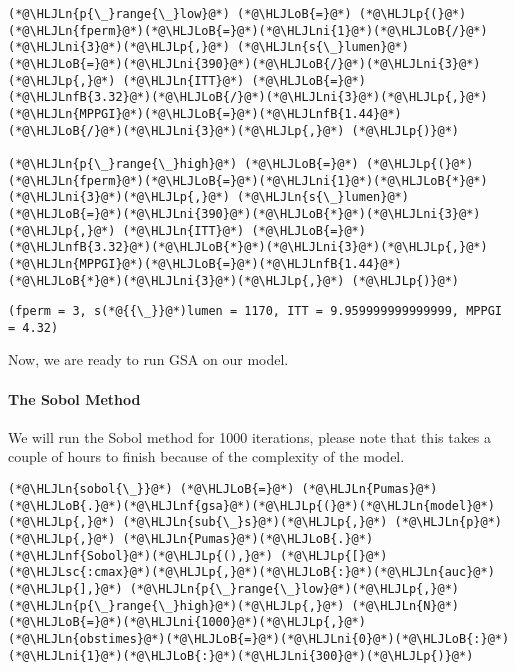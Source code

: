 \documentclass[12pt,a4paper]{article}
\newcommand{\HLJLn}[1]{#1}
\newcommand{\HLJLnf}[1]{\textcolor[RGB]{66,102,213}{#1}}
\newcommand{\HLJLsc}[1]{\textcolor[RGB]{201,61,57}{#1}}
\newcommand{\HLJLnfB}[1]{\textcolor[RGB]{59,151,46}{#1}}
\newcommand{\HLJLni}[1]{\textcolor[RGB]{59,151,46}{#1}}
\newcommand{\HLJLoB}[1]{\textcolor[RGB]{102,102,102}{\textbf{#1}}}
\newcommand{\HLJLp}[1]{#1}
\begin{document}
\begin{lstlisting}
(*@\HLJLn{p{\_}range{\_}low}@*) (*@\HLJLoB{=}@*) (*@\HLJLp{(}@*)(*@\HLJLn{fperm}@*)(*@\HLJLoB{=}@*)(*@\HLJLni{1}@*)(*@\HLJLoB{/}@*)(*@\HLJLni{3}@*)(*@\HLJLp{,}@*) (*@\HLJLn{s{\_}lumen}@*)(*@\HLJLoB{=}@*)(*@\HLJLni{390}@*)(*@\HLJLoB{/}@*)(*@\HLJLni{3}@*)(*@\HLJLp{,}@*) (*@\HLJLn{ITT}@*) (*@\HLJLoB{=}@*) (*@\HLJLnfB{3.32}@*)(*@\HLJLoB{/}@*)(*@\HLJLni{3}@*)(*@\HLJLp{,}@*) (*@\HLJLn{MPPGI}@*)(*@\HLJLoB{=}@*)(*@\HLJLnfB{1.44}@*)(*@\HLJLoB{/}@*)(*@\HLJLni{3}@*)(*@\HLJLp{,}@*) (*@\HLJLp{)}@*)

(*@\HLJLn{p{\_}range{\_}high}@*) (*@\HLJLoB{=}@*) (*@\HLJLp{(}@*)(*@\HLJLn{fperm}@*)(*@\HLJLoB{=}@*)(*@\HLJLni{1}@*)(*@\HLJLoB{*}@*)(*@\HLJLni{3}@*)(*@\HLJLp{,}@*) (*@\HLJLn{s{\_}lumen}@*)(*@\HLJLoB{=}@*)(*@\HLJLni{390}@*)(*@\HLJLoB{*}@*)(*@\HLJLni{3}@*)(*@\HLJLp{,}@*) (*@\HLJLn{ITT}@*) (*@\HLJLoB{=}@*) (*@\HLJLnfB{3.32}@*)(*@\HLJLoB{*}@*)(*@\HLJLni{3}@*)(*@\HLJLp{,}@*) (*@\HLJLn{MPPGI}@*)(*@\HLJLoB{=}@*)(*@\HLJLnfB{1.44}@*)(*@\HLJLoB{*}@*)(*@\HLJLni{3}@*)(*@\HLJLp{,}@*) (*@\HLJLp{)}@*)
\end{lstlisting}

\begin{lstlisting}
(fperm = 3, s(*@{{\_}}@*)lumen = 1170, ITT = 9.959999999999999, MPPGI = 4.32)
\end{lstlisting}


Now, we are ready to run GSA on our model.

\paragraph{The Sobol Method}
We will run the Sobol method for 1000 iterations, please note that this takes a couple of hours to finish because of the complexity of the model.


\begin{lstlisting}
(*@\HLJLn{sobol{\_}}@*) (*@\HLJLoB{=}@*) (*@\HLJLn{Pumas}@*)(*@\HLJLoB{.}@*)(*@\HLJLnf{gsa}@*)(*@\HLJLp{(}@*)(*@\HLJLn{model}@*)(*@\HLJLp{,}@*) (*@\HLJLn{sub{\_}s}@*)(*@\HLJLp{,}@*) (*@\HLJLn{p}@*)(*@\HLJLp{,}@*) (*@\HLJLn{Pumas}@*)(*@\HLJLoB{.}@*)(*@\HLJLnf{Sobol}@*)(*@\HLJLp{(),}@*) (*@\HLJLp{[}@*)(*@\HLJLsc{:cmax}@*)(*@\HLJLp{,}@*)(*@\HLJLoB{:}@*)(*@\HLJLn{auc}@*)(*@\HLJLp{],}@*) (*@\HLJLn{p{\_}range{\_}low}@*)(*@\HLJLp{,}@*)(*@\HLJLn{p{\_}range{\_}high}@*)(*@\HLJLp{,}@*) (*@\HLJLn{N}@*)(*@\HLJLoB{=}@*)(*@\HLJLni{1000}@*)(*@\HLJLp{,}@*) (*@\HLJLn{obstimes}@*)(*@\HLJLoB{=}@*)(*@\HLJLni{0}@*)(*@\HLJLoB{:}@*)(*@\HLJLni{1}@*)(*@\HLJLoB{:}@*)(*@\HLJLni{300}@*)(*@\HLJLp{)}@*)
\end{lstlisting}
\end{document}
